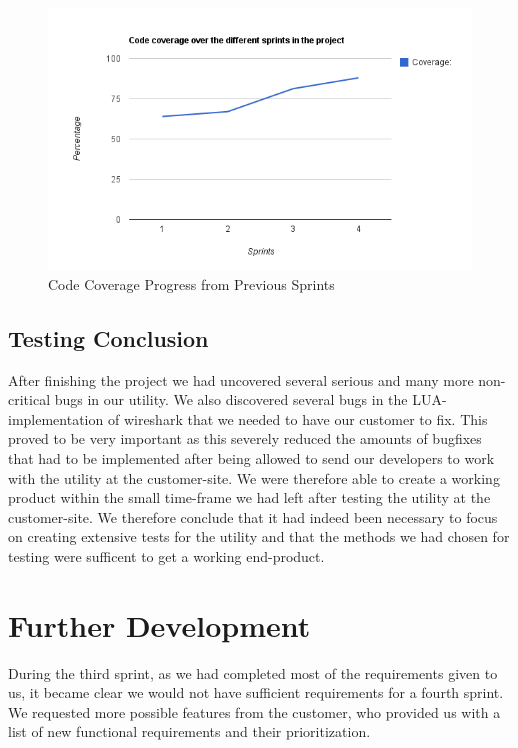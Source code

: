 \begin{figure}[htb]
	\center
	\includegraphics[width=\textwidth]{./sprints/img/sprint4_code_coverage_chart}
	\caption{Code Coverage Progress from Previous Sprints\label{fig:sp4CoverageChart}}
\end{figure}

\subsection{Testing Conclusion}
After finishing the project we had uncovered several serious and many more non-critical bugs in our utility. We also discovered several bugs in the LUA-implementation of wireshark that we needed to have our customer to fix. This proved to be very important as this severely reduced the amounts of bugfixes that had to be implemented after being allowed to send our developers to work with the utility at the customer-site. We were therefore able to create a working product within the small time-frame we had left after testing the utility at the customer-site. We therefore conclude that it had indeed been necessary to focus on creating extensive tests for the utility and that the methods we had chosen for testing were sufficent to get a working end-product.

\section{Further Development}
\label{sec:eval:furtherdev}
During the third sprint, as we had completed most of the requirements given to us, it became clear we would not have sufficient requirements for a fourth sprint. We requested more possible features from the customer, who provided us with a list of new functional requirements and their prioritization.


